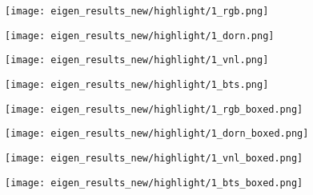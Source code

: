 \documentclass[10pt,twocolumn,letterpaper]{article}
\begin{document}
\begin{figure*}
	\centering
	\begin{subfigure}{.18\linewidth}
		\centering
		\texttt{[image: eigen\_results\_new/highlight/1\_rgb.png]}
	\end{subfigure}
	\hspace{1em}
	\begin{subfigure}{.18\linewidth}
		\centering
		\texttt{[image: eigen\_results\_new/highlight/1\_dorn.png]}
	\end{subfigure}
	\hspace{1em}
	\begin{subfigure}{.18\linewidth}
		\centering
		\texttt{[image: eigen\_results\_new/highlight/1\_vnl.png]}
	\end{subfigure}
	\hspace{1em}
	\begin{subfigure}{.18\linewidth}
		\centering
		\texttt{[image: eigen\_results\_new/highlight/1\_bts.png]}
	\end{subfigure}
	
	\begin{subfigure}{.18\linewidth}
		\centering
		\texttt{[image: eigen\_results\_new/highlight/1\_rgb\_boxed.png]}
	\end{subfigure}
	\hspace{1em}
	\begin{subfigure}{.18\linewidth}
		\centering
		\texttt{[image: eigen\_results\_new/highlight/1\_dorn\_boxed.png]}
	\end{subfigure}
	\hspace{1em}
	\begin{subfigure}{.18\linewidth}
		\centering
		\texttt{[image: eigen\_results\_new/highlight/1\_vnl\_boxed.png]}
	\end{subfigure}
	\hspace{1em}
	\begin{subfigure}{.18\linewidth}
		\centering
		\texttt{[image: eigen\_results\_new/highlight/1\_bts\_boxed.png]}
	\end{subfigure}
	\vspace{0.15cm}
	

\end{figure*}
\end{document}
